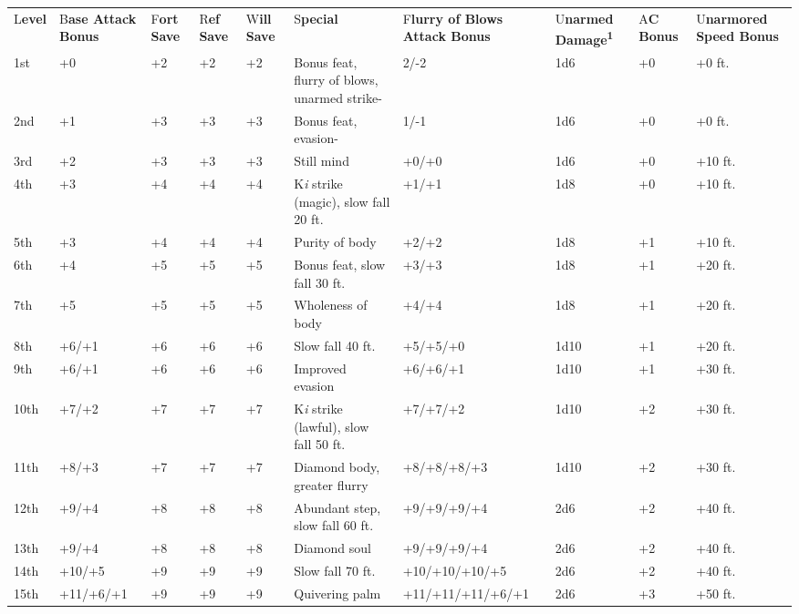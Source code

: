 \documentclass{article}
\begin{document}
\vspace{12pt}
\begin{tabular}{|>{\raggedright}p{27pt}|>{\raggedright}p{28pt}|>{\raggedright}p{12pt}|>{\raggedright}p{12pt}|>{\raggedright}p{10pt}|>{\raggedright}p{51pt}|>{\raggedright}p{47pt}|>{\raggedright}p{23pt}|>{\raggedright}p{15pt}|>{\raggedright}p{28pt}|}
\hline
\multicolumn{10}{|p{256pt}|}{
T\textbf{able: The Monk}}\tabularnewline
\hline
L\textbf{evel} & B\textbf{ase Attack Bonus} & F\textbf{ort Save} & R\textbf{ef 
Save} & W\textbf{ill Save} & S\textbf{pecial} & F\textbf{lurry of Blows Attack 
Bonus} & U\textbf{narmed Damage}\textsuperscript{\textbf{1}} & A\textbf{C Bonus} & U\textbf{narmored 
 Speed Bonus}\tabularnewline
\hline
1st & +0 & +2 & +2 & +2 & Bonus feat, flurry of blows, unarmed strike- & 2/-2 & 1d6 & +0 & +0 
ft.\tabularnewline
\hline
2nd & +1 & +3 & +3 & +3 & Bonus feat, evasion- & 1/-1 & 1d6 & +0 & +0 ft.\tabularnewline
\hline
3rd & +2 & +3 & +3 & +3 & Still mind & +0/+0 & 1d6 & +0 & +10 ft.\tabularnewline
\hline
4th & +3 & +4 & +4 & +4 & K\textit{i }strike (magic), \linebreak{}
slow fall 20 ft. & +1/+1 & 1d8 & +0 & +10 ft.\tabularnewline
\hline
5th & +3 & +4 & +4 & +4 & Purity of body & +2/+2 & 1d8 & +1 & +10 ft.\tabularnewline
\hline
6th & +4 & +5 & +5 & +5 & Bonus feat, \linebreak{}
slow fall 30 ft. & +3/+3 & 1d8 & +1 & +20 ft.\tabularnewline
\hline
7th & +5 & +5 & +5 & +5 & Wholeness of body & +4/+4 & 1d8 & +1 & +20 ft.\tabularnewline
\hline
8th & +6/+1 & +6 & +6 & +6 & Slow fall 40 ft. & +5/+5/+0 & 1d10 & +1 & +20 ft.\tabularnewline
\hline
9th & +6/+1 & +6 & +6 & +6 & Improved evasion & +6/+6/+1 & 1d10 & +1 & +30 ft.\tabularnewline
\hline
10th & +7/+2 & +7 & +7 & +7 & K\textit{i }strike (lawful), \linebreak{}
slow fall 50 ft. & +7/+7/+2 & 1d10 & +2 & +30 ft.\tabularnewline
\hline
11th & +8/+3 & +7 & +7 & +7 & Diamond body, \linebreak{}
greater flurry & +8/+8/+8/+3 & 1d10 & +2 & +30 ft.\tabularnewline
\hline
12th & +9/+4 & +8 & +8 & +8 & Abundant step, \linebreak{}
slow fall 60 ft. & +9/+9/+9/+4 & 2d6 & +2 & +40 ft.\tabularnewline
\hline
13th & +9/+4 & +8 & +8 & +8 & Diamond soul & +9/+9/+9/+4 & 2d6 & +2 & +40 ft.\tabularnewline
\hline
14th & +10/+5 & +9 & +9 & +9 & Slow fall 70 ft. & +10/+10/+10/+5 & 2d6 & +2 & +40 
ft.\tabularnewline
\hline
15th & +11/+6/+1 & +9 & +9 & +9 & Quivering palm & +11/+11/+11/+6/+1 & 2d6 & +3 & +50 
ft.\tabularnewline
\hline

\end{tabular}
\end{document}
